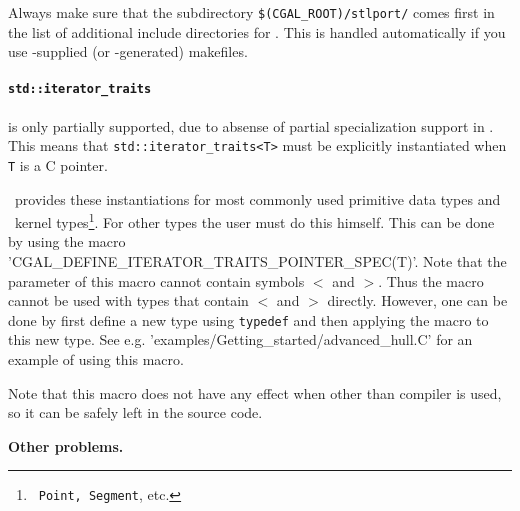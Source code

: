 Always make sure that the subdirectory
\texttt{\$(CGAL\_ROOT)/stlport/} %
comes first in the list of additional include directories for \msvc.
This is handled automatically if you use \cgal-supplied (or \cgal-generated)
makefiles.


\paragraph{\texttt{std::iterator\_traits}} is only partially
supported, due to absense of partial specialization support in \msvc.
This means that \texttt{std::iterator\_traits<T>} must be explicitly
instantiated when \texttt{T} is a C pointer. 

\cgal\ provides
these instantiations for most commonly used primitive data types and
\cgal\ kernel types\footnote{\cgal\ \texttt{Point, Segment}, etc.}.
For other types the user must do this himself.  
This can be done by using the macro
\nonlinkedpath'CGAL_DEFINE_ITERATOR_TRAITS_POINTER_SPEC(T)'.
Note that the parameter of this macro cannot contain symbols $<$ and
$>$. Thus the macro cannot be used with types that contain $<$ and $>$
directly. However, one can be done by first define a new type using 
\texttt{typedef} and then applying the macro to this new type.
See e.g. \nonlinkedpath'examples/Getting_started/advanced_hull.C'
for an example of using this macro.

Note that this macro does not have any effect when other than
 compiler is used, so it can be safely left in the source code. 
\medskip

\textbf{Other problems.}

